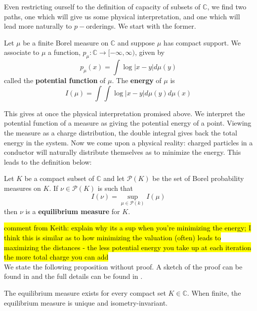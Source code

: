 Even restricting ourself to the definition of capacity of subsets of $\mathbb{C}$, we find two paths, one which will give us some physical interpretation, and one which will lead more naturally to $p-$orderings. We start with the former.\\

\begin{definition} 
\cite{rand} Let $\mu$ be a finite Borel measure on $\mathbb{C}$ and suppose $\mu$ has compact support.  We associate to $\mu$ a function, $p_{\mu}:\mathbb{C} \rightarrow [-\infty, \infty)$, given by
\[p_\mu (x) =\int \log \lvert x - y \rvert d\mu(y)\] called the \textbf{potential function} of $\mu$. The \textbf{energy} of $\mu$ is 
\[I(\mu) =\int \int \log \lvert x - y \rvert d\mu(y) d\mu(x)\]
\end{definition}

This gives at once the physical interpretation promised above. We interpret the potential function of a measure as giving the potential energy of a point. Viewing the measure as a charge distribution, the double integral gives back the total energy in the system. Now we come upon a physical reality: charged particles in a conductor will naturally distribute themselves as to minimize the energy. This leads to the definition below:\\

\begin{definition}
\cite{rand} Let $K$ be a compact subset of $\mathbb{C}$ and let $\mathcal{P}(K)$ be the set of Borel probability measures on $K$. If $\nu \in \mathcal{P}(K)$ is such that 
\[I(\nu) = \sup_{\mu \in \mathcal{P}(k)} I(\mu)\] then $\nu$ is a \textbf{equilibrium measure} for $K$.
\end{definition}

\hl{comment from Keith:  explain why its a sup when you're minimizing the energy; I think this is similar as to how minimizing the valuation (often) leads to maximizing the distances - the less potential energy you take up at each iteration the more total charge you can add}\\
We state the following proposition without proof. A sketch of the proof can be found in \cite{fp} and the full details can be found in \cite{rand}.\\

\begin{proposition}
\cite{rand} The equilibrium measure exists for every compact set $K \in \mathbb{C}$. When finite, the equilibrium measure is unique and isometry-invariant.
\end{proposition}

